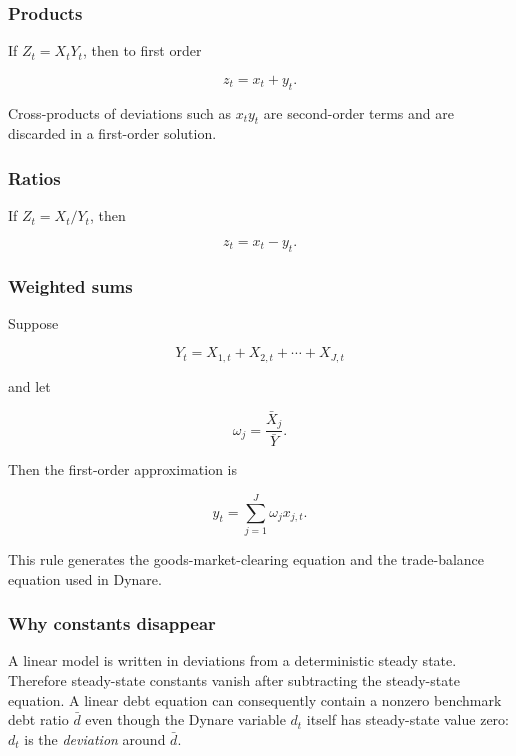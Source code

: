 \subsubsection{Products}

If \(Z_t=X_tY_t\), then to first order

\begin{equation}
z_t=x_t+y_t.
\end{equation}

Cross-products of deviations such as \(x_ty_t\) are second-order terms and are
discarded in a first-order solution.

\subsubsection{Ratios}

If \(Z_t=X_t/Y_t\), then

\begin{equation}
z_t=x_t-y_t.
\end{equation}

\subsubsection{Weighted sums}

Suppose

\[
Y_t=X_{1,t}+X_{2,t}+\cdots+X_{J,t}
\]

and let

\[
\omega_j=\frac{\bar X_j}{\bar Y}.
\]

Then the first-order approximation is

\begin{equation}
y_t
=
\sum_{j=1}^{J}\omega_j x_{j,t}.
\label{eq:sharelinearization}
\end{equation}

This rule generates the goods-market-clearing equation and the trade-balance
equation used in Dynare.

\subsubsection{Why constants disappear}

A linear model is written in deviations from a deterministic steady state.
Therefore steady-state constants vanish after subtracting the steady-state
equation. A linear debt equation can consequently contain a nonzero benchmark
debt ratio \(\bar d\) even though the Dynare variable \(d_t\) itself has
steady-state value zero: \(d_t\) is the \emph{deviation} around \(\bar d\).

